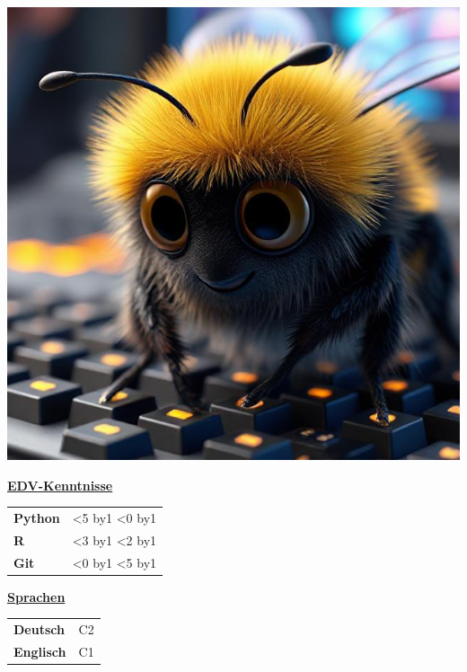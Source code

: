 \documentclass[10pt,a4paper]{article}
\makeatletter
\providecommand{\faCircle}{\large\textbullet} %
\newcommand{\sidehead}[1]{\vspace{1ex}\textbf{\large #1}\par\vspace{0.4em}}
\newcommand{\reptoken}[2]{%
  \begingroup\@tempcnta=0\relax
  \loop\ifnum\@tempcnta<#1 #2\advance\@tempcnta by1\relax\repeat
  \endgroup}
\newcommand{\pictofraction}[6]{%
  {\begingroup #6%
    \reptoken{#3}{\textcolor{#2}{#1}}%
    \reptoken{#5}{\textcolor{#4}{#1}}%
  \endgroup}}
\newcommand{\skillrow}[3]{%
  \textbf{#1} & \pictofraction{\faCircle}{cvgreen}{#2}{black!30}{#3}{\tiny} \\}
\newcommand{\langrow}[2]{\textbf{#1} & #2\\}
\newlength{\photoH}
\makeatother
\begin{document}
\pagestyle{empty}
\small
\color{textgray}

\begin{paracol}{2}

\color{white}\raggedright\normalsize

\begin{minipage}[t][\photoH][t]{\linewidth}
  \includegraphics[height=\photoH,width=\linewidth,keepaspectratio]{bombus.jpg}
\end{minipage}


\sidehead{\underline{EDV-Kenntnisse}}
\setlength{\tabcolsep}{4pt}
\begin{tabularx}{\linewidth}{@{}>{\bfseries}l >{\raggedright\arraybackslash}X@{}}
  \skillrow{Python}{5}{0}
  \skillrow{R}{3}{2}
  \skillrow{Git}{0}{5}
\end{tabularx}


\sidehead{\underline{Sprachen}}
\begin{tabularx}{\linewidth}{@{}>{\bfseries}l >{\centering\arraybackslash}p{12mm}@{}}
  \langrow{Deutsch}{C2}
  \langrow{Englisch}{C1}
\end{tabularx}


\end{paracol}
\end{document}
